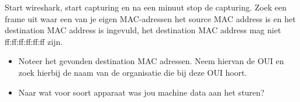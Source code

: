 Start wireshark, start capturing en na een minuut stop de capturing. Zoek een frame uit waar een van je eigen MAC-adressen het source MAC address is en het destination MAC address is ingevuld, het destination MAC address mag niet ff:ff:ff:ff:ff:ff zijn.

\begin{itemize}
	\item Noteer het gevonden destination MAC adressen. Neem hiervan de OUI en zoek hierbij de naam van de organisatie die bij deze OUI hoort.
	\item Naar wat voor soort apparaat was jou machine data aan het sturen?
\end{itemize}
